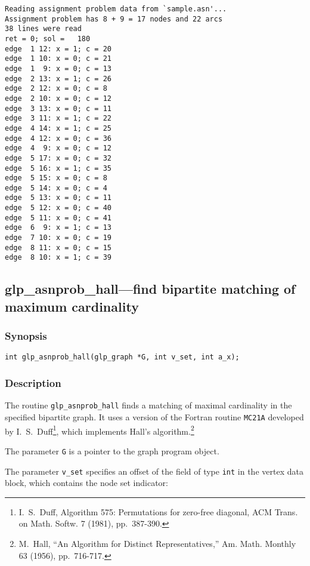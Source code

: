 \begin{footnotesize}
\begin{verbatim}
Reading assignment problem data from `sample.asn'...
Assignment problem has 8 + 9 = 17 nodes and 22 arcs
38 lines were read
ret = 0; sol =   180
edge  1 12: x = 1; c = 20
edge  1 10: x = 0; c = 21
edge  1  9: x = 0; c = 13
edge  2 13: x = 1; c = 26
edge  2 12: x = 0; c = 8
edge  2 10: x = 0; c = 12
edge  3 13: x = 0; c = 11
edge  3 11: x = 1; c = 22
edge  4 14: x = 1; c = 25
edge  4 12: x = 0; c = 36
edge  4  9: x = 0; c = 12
edge  5 17: x = 0; c = 32
edge  5 16: x = 1; c = 35
edge  5 15: x = 0; c = 8
edge  5 14: x = 0; c = 4
edge  5 13: x = 0; c = 11
edge  5 12: x = 0; c = 40
edge  5 11: x = 0; c = 41
edge  6  9: x = 1; c = 13
edge  7 10: x = 0; c = 19
edge  8 11: x = 0; c = 15
edge  8 10: x = 1; c = 39
\end{verbatim}
\end{footnotesize}

\newpage

\subsection{glp\_asnprob\_hall---find bipartite matching of maximum
cardinality}

\subsubsection*{Synopsis}

\begin{verbatim}
int glp_asnprob_hall(glp_graph *G, int v_set, int a_x);
\end{verbatim}

\subsubsection*{Description}

The routine \verb|glp_asnprob_hall| finds a matching of maximal
cardinality in the specified bipartite graph. It uses a version of the
Fortran routine \verb|MC21A| developed by
I.~S.~Duff\footnote{I.~S.~Duff, Algorithm 575: Permutations for
zero-free diagonal, ACM Trans. on Math. Softw. 7 (1981), pp.~387-390.},
which implements Hall's algorithm.\footnote{M.~Hall, ``An Algorithm for
Distinct Representatives,'' Am. Math. Monthly 63 (1956), pp.~716-717.}

The parameter \verb|G| is a pointer to the graph program object.

The parameter \verb|v_set| specifies an offset of the field of type
\verb|int| in the vertex data block, which contains the node set
indicator:

